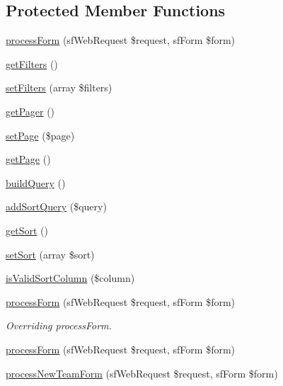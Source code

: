 \subsection*{Protected Member Functions}
\begin{DoxyCompactItemize}
\item 
\hyperlink{classteam_actions_a7cf661d837626e0320753cbffa019a01}{process\-Form} (sf\-Web\-Request \$request, sf\-Form \$form)
\item 
\hyperlink{classteam_actions_a428d91319fc73d3038784cf5436936b6}{get\-Filters} ()
\item 
\hyperlink{classteam_actions_a704f1dec273c7931234f71747c8befe4}{set\-Filters} (array \$filters)
\item 
\hyperlink{classteam_actions_a3b3399f1f3eff687679a14cd13142020}{get\-Pager} ()
\item 
\hyperlink{classteam_actions_a2dffbdff8d3cad39021cb6d9b82192cb}{set\-Page} (\$page)
\item 
\hyperlink{classteam_actions_a12a549e25239c9219e66322cf6a1be68}{get\-Page} ()
\item 
\hyperlink{classteam_actions_a394445491b1b221e4e562dfb45f2a266}{build\-Query} ()
\item 
\hyperlink{classteam_actions_af852ea2f6a319a73231a5b6c888137aa}{add\-Sort\-Query} (\$query)
\item 
\hyperlink{classteam_actions_a985cd57267e9df94a30216e2a3177331}{get\-Sort} ()
\item 
\hyperlink{classteam_actions_a37dc6beeae1df7c42eb048ebfe8d74b6}{set\-Sort} (array \$sort)
\item 
\hyperlink{classteam_actions_aaa9d14781a73cf9a0fad267fca707465}{is\-Valid\-Sort\-Column} (\$column)
\item 
\hyperlink{classteam_actions_a7cf661d837626e0320753cbffa019a01}{process\-Form} (sf\-Web\-Request \$request, sf\-Form \$form)
\begin{DoxyCompactList}\small\item\em Overriding process\-Form. \end{DoxyCompactList}\item 
\hyperlink{classteam_actions_a7cf661d837626e0320753cbffa019a01}{process\-Form} (sf\-Web\-Request \$request, sf\-Form \$form)
\item 
\hyperlink{classteam_actions_a7934e5092d27f49b1f39ef82c30ebc1e}{process\-New\-Team\-Form} (sf\-Web\-Request \$request, sf\-Form \$form)
\end{DoxyCompactItemize}


